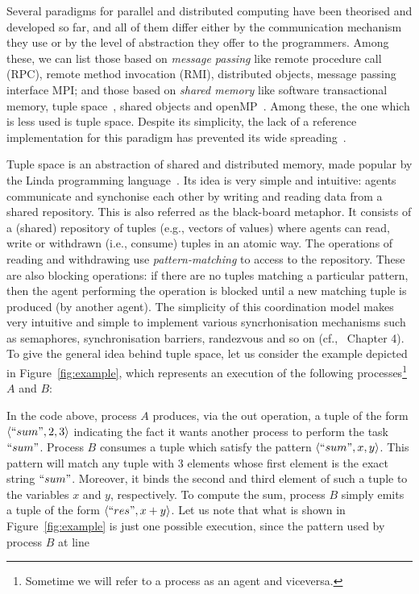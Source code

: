 
Several paradigms for parallel and distributed computing have been theorised and developed so far, and all of them differ either by the communication mechanism they use or by the level of abstraction they offer to the programmers. Among these, we can list those based on \emph{message passing} like remote procedure call (RPC), remote method invocation (RMI), distributed objects, message passing interface MPI; and those based on \emph{shared memory} like software transactional memory, tuple space~\cite{Gelernter85}, shared objects and  openMP~\cite{Mattson03}. Among these, the one which is less used is tuple space. Despite its simplicity, the lack of a reference implementation for this paradigm has prevented its wide spreading~\cite{BuravlevNM18}.


Tuple space is an abstraction of shared and distributed memory, made popular by the Linda programming language~\cite{Gelernter85}. Its idea is very simple and intuitive: agents communicate and synchonise each other by writing and reading data from a shared repository. This is also referred as the black-board metaphor. 
It consists of a (shared) repository of tuples (e.g., vectors of values) where agents can read, write or withdrawn (i.e., consume) tuples in an atomic way. 
The operations of reading and withdrawing use  \emph{pattern-matching} to access to the repository.
 These are also blocking operations:  if there are no tuples matching a particular pattern, then the agent performing the operation is blocked until a new matching tuple is produced (by another agent). The simplicity of this coordination model makes very intuitive and simple to implement various syncrhonisation mechanisms such as semaphores, synchronisation barriers, randezvous and so on (cf.,~\cite{Doberkat00b} Chapter 4). To give the general idea behind tuple space, let us consider the example depicted in Figure~\ref{fig:example}, which represents an execution of the following processes\footnote{Sometime we will refer to a process as an agent and viceversa.} $A$ and $B$: 
 
 \noindent In the code above, process $A$ produces, via the out operation, a tuple of the form $\langle ``sum",2,3 \rangle$ indicating the fact it wants
 another process to perform the task $``sum"$. Process $B$ consumes a tuple which satisfy the pattern $\langle ``sum",x,y \rangle$. This pattern will match any tuple with 3 elements 
  whose first element is the exact string
 $``sum"$. Moreover, it  binds the second and third element of such a tuple to the variables $x$ and $y$, respectively. To compute the sum, process $B$ simply emits a tuple of the form $\langle ``res",x+y \rangle$. Let us note that what is shown in Figure~\ref{fig:example} is just one possible execution, since the pattern used by process $B$ at line
